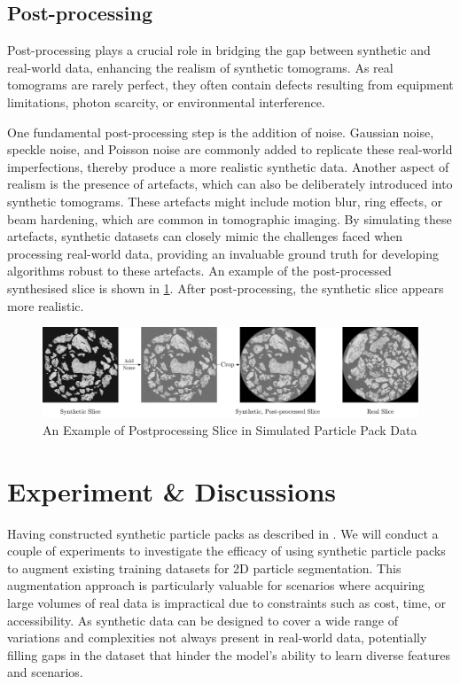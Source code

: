 \documentclass[preprint,12pt]{elsarticle}
\begin{document}
\subsection{Post-processing}
Post-processing plays a crucial role in bridging the gap between synthetic and real-world data, enhancing the realism of synthetic tomograms. 
As real tomograms are rarely perfect, they often contain defects resulting from equipment limitations, photon scarcity, or environmental interference. 
\par
One fundamental post-processing step is the addition of noise. 
Gaussian noise, speckle noise, and Poisson noise are commonly added to replicate these real-world imperfections, thereby produce a more realistic synthetic data.
Another aspect of realism is the presence of artefacts, which can also be deliberately introduced into synthetic tomograms. 
These artefacts might include motion blur, ring effects, or beam hardening, which are common in tomographic imaging. 
By simulating these artefacts, synthetic datasets can closely mimic the challenges faced when processing real-world data, providing an invaluable ground truth for developing algorithms robust to these artefacts.
An example of the post-processed synthesised slice is shown in \cref{fig:syn:postprocess}. 
After post-processing, the synthetic slice appears more realistic.
\begin{figure}[H]
    \includegraphics[width=\textwidth]{figures/pdf/postprocess.pdf}
    \caption{An Example of Postprocessing Slice in Simulated Particle Pack Data}
    \label{fig:syn:postprocess}
\end{figure}

\section{Experiment \& Discussions}

Having constructed synthetic particle packs as described in . 
We will conduct a couple of experiments to investigate the efficacy of using synthetic particle packs to augment existing training datasets for 2D particle segmentation.
This augmentation approach is particularly valuable for scenarios where acquiring large volumes of real data is impractical due to constraints such as cost, time, or accessibility. 
As synthetic data can be designed to cover a wide range of variations and complexities not always present in real-world data, potentially filling gaps in the dataset that hinder the model's ability to learn diverse features and scenarios.
\end{document}
